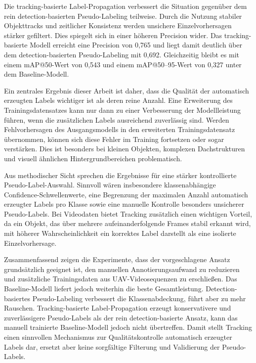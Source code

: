 Die tracking-basierte Label-Propagation verbessert die Situation gegenüber dem
rein detection-basierten Pseudo-Labeling teilweise. Durch die Nutzung stabiler
Objekttracks und zeitlicher Konsistenz werden unsichere Einzelvorhersagen stärker
gefiltert. Dies spiegelt sich in einer höheren Precision wider. Das tracking-basierte
Modell erreicht eine Precision von 0{,}765 und liegt damit deutlich über dem
detection-basierten Pseudo-Labeling mit 0{,}692. Gleichzeitig bleibt es mit einem
mAP@50-Wert von 0{,}543 und einem mAP@50--95-Wert von 0{,}327 unter dem
Baseline-Modell.

Ein zentrales Ergebnis dieser Arbeit ist daher, dass die Qualität der automatisch
erzeugten Labels wichtiger ist als deren reine Anzahl. Eine Erweiterung des
Trainingsdatensatzes kann nur dann zu einer Verbesserung der Modellleistung
führen, wenn die zusätzlichen Labels ausreichend zuverlässig sind. Werden
Fehlvorhersagen des Ausgangsmodells in den erweiterten Trainingsdatensatz
übernommen, können sich diese Fehler im Training fortsetzen oder sogar verstärken.
Dies ist besonders bei kleinen Objekten, komplexen Dachstrukturen und visuell
ähnlichen Hintergrundbereichen problematisch.

Aus methodischer Sicht sprechen die Ergebnisse für eine stärker kontrollierte
Pseudo-Label-Auswahl. Sinnvoll wären insbesondere klassenabhängige
Confidence-Schwellenwerte, eine Begrenzung der maximalen Anzahl automatisch
erzeugter Labels pro Klasse sowie eine manuelle Kontrolle besonders unsicherer
Pseudo-Labels. Bei Videodaten bietet Tracking zusätzlich einen wichtigen Vorteil,
da ein Objekt, das über mehrere aufeinanderfolgende Frames stabil erkannt wird,
mit höherer Wahrscheinlichkeit ein korrektes Label darstellt als eine isolierte
Einzelvorhersage.

Zusammenfassend zeigen die Experimente, dass der vorgeschlagene Ansatz
grundsätzlich geeignet ist, den manuellen Annotierungsaufwand zu reduzieren und
zusätzliche Trainingsdaten aus UAV-Videosequenzen zu erschließen. Das
Baseline-Modell liefert jedoch weiterhin die beste Gesamtleistung. Detection-basiertes
Pseudo-Labeling verbessert die Klassenabdeckung, führt aber zu mehr Rauschen.
Tracking-basierte Label-Propagation erzeugt konservativere und zuverlässigere
Pseudo-Labels als der rein detection-basierte Ansatz, kann das manuell trainierte
Baseline-Modell jedoch nicht übertreffen. Damit stellt Tracking einen sinnvollen
Mechanismus zur Qualitätskontrolle automatisch erzeugter Labels dar, ersetzt aber
keine sorgfältige Filterung und Validierung der Pseudo-Labels.